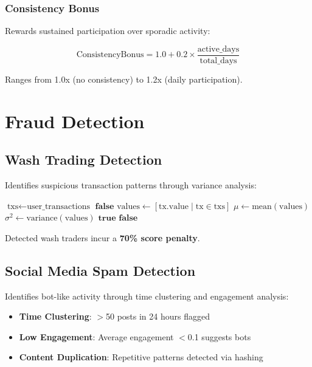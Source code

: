 \documentclass[11pt,a4paper]{article}
\begin{document}
\subsubsection{Consistency Bonus}

Rewards sustained participation over sporadic activity:

\begin{equation}
\text{ConsistencyBonus} = 1.0 + 0.2 \times \frac{\text{active\_days}}{\text{total\_days}}
\end{equation}

Ranges from 1.0x (no consistency) to 1.2x (daily participation).

\section{Fraud Detection}

\subsection{Wash Trading Detection}

Identifies suspicious transaction patterns through variance analysis:

\begin{algorithm}
\caption{Wash Trading Detection}
\begin{algorithmic}[1]
\State $\text{txs} \gets \text{user\_transactions}$
    \State \Return $\textbf{false}$ 
\EndIf
\State $\text{values} \gets [\text{tx.value} \mid \text{tx} \in \text{txs}]$
\State $\mu \gets \text{mean}(\text{values})$
\State $\sigma^2 \gets \text{variance}(\text{values})$
    \State \Return $\textbf{true}$ 
\Else
    \State \Return $\textbf{false}$
\EndIf
\end{algorithmic}
\end{algorithm}

Detected wash traders incur a \textbf{70\% score penalty}.

\subsection{Social Media Spam Detection}

Identifies bot-like activity through time clustering and engagement analysis:

\begin{itemize}
    \item \textbf{Time Clustering}: $>$50 posts in 24 hours flagged
    \item \textbf{Low Engagement}: Average engagement $<$0.1 suggests bots
    \item \textbf{Content Duplication}: Repetitive patterns detected via hashing
\end{itemize}
\end{document}
